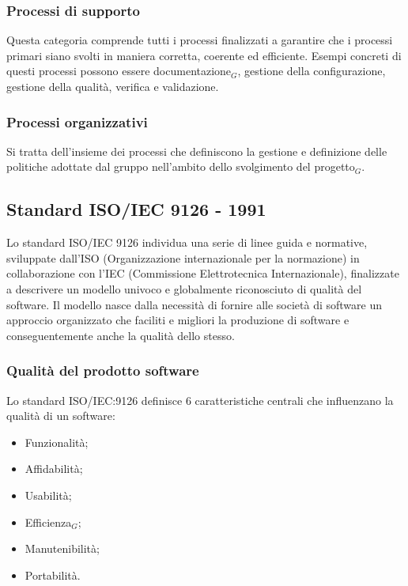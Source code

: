 \documentclass[10pt]{article}
\begin{document}
\begin{justify}
        \subsubsection{Processi di supporto}
        Questa categoria comprende tutti i processi finalizzati a garantire che i processi primari siano svolti in maniera corretta, coerente ed efficiente. Esempi concreti di questi processi possono essere documentazione$_G$, gestione della configurazione, gestione della qualità, verifica e validazione.

        \subsubsection{Processi organizzativi}
        Si tratta dell'insieme dei processi che definiscono la gestione e definizione delle politiche adottate dal gruppo nell'ambito dello
        svolgimento del progetto$_G$.

    \subsection{Standard ISO/IEC 9126 - 1991}
    \label{standard_9126}
    Lo standard ISO/IEC 9126 individua una serie di linee guida e normative, sviluppate dall'ISO (Organizzazione internazionale per la normazione) in collaborazione con l'IEC (Commissione Elettrotecnica Internazionale), finalizzate a descrivere un modello univoco e globalmente riconosciuto di qualità del software. Il modello nasce dalla necessità di fornire alle società di software un approccio organizzato che faciliti e migliori la produzione di software e conseguentemente anche la qualità dello stesso.

        \subsubsection{Qualità del prodotto software}
        Lo standard ISO/IEC:9126 definisce 6 caratteristiche centrali che influenzano la qualità di un software:
        \begin{itemize}
            \item Funzionalità;
            \item Affidabilità;
            \item Usabilità;
            \item Efficienza$_G$;
            \item Manutenibilità;
            \item Portabilità.
        \end{itemize}


\end{justify}
\end{document}
